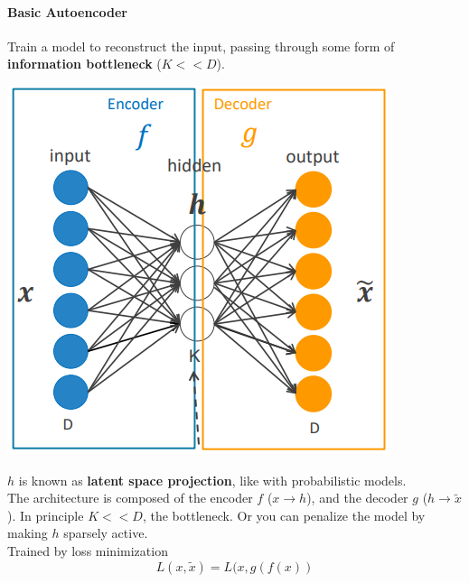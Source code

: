 \documentclass[10pt]{report}
\begin{document}
\paragraph{Basic Autoencoder} Train a model to reconstruct the input, passing through some form of \textbf{information bottleneck} ($K<<D$).\begin{center}
	\includegraphics[scale=0.5]{75.png}
\end{center}
$h$ is known as \textbf{latent space projection}, like with probabilistic models.\\
The architecture is composed of the encoder $f$ ($x\rightarrow h$), and the decoder $g$ ($h\rightarrow\tilde{x}$). In principle $K << D$, the bottleneck. Or you can penalize the model by making $h$ sparsely active.\\
Trained by loss minimization
$$L(x,\tilde{x})=L(x,g(f(x))$$
\end{document}
